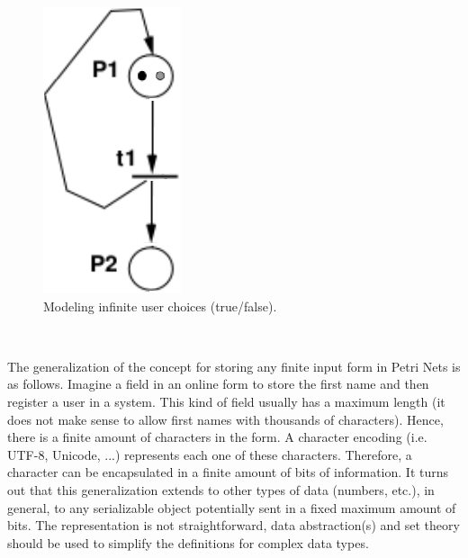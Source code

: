 \documentclass[12pt,english]{article} %
\begin{document}
\begin{figure}[H]
    \centering
    \includegraphics[scale=0.41]{img/petri-net/cpn/cpn-user-input-choices.png}
    \caption{Modeling infinite user choices (true/false).}
    \label{fig:cpn-user-input-choices}
\end{figure}

\

The generalization of the concept for storing any finite input form in Petri Nets is as follows.
Imagine a field in an online form to store the first name and then register a user in a system.
This kind of field usually has a maximum length (it does not make sense to allow first names with thousands of characters).
Hence, there is a finite amount of characters in the form.
A character encoding (i.e. UTF-8, Unicode, ...) represents each one of these characters.
Therefore, a character can be encapsulated in a finite amount of bits of information.
It turns out that this generalization extends to other types of data (numbers, etc.), in general, to any serializable object potentially sent in a fixed maximum amount of bits.
The representation is not straightforward, data abstraction(s) and set theory should be used to simplify the definitions for complex data types.

\
\end{document}
